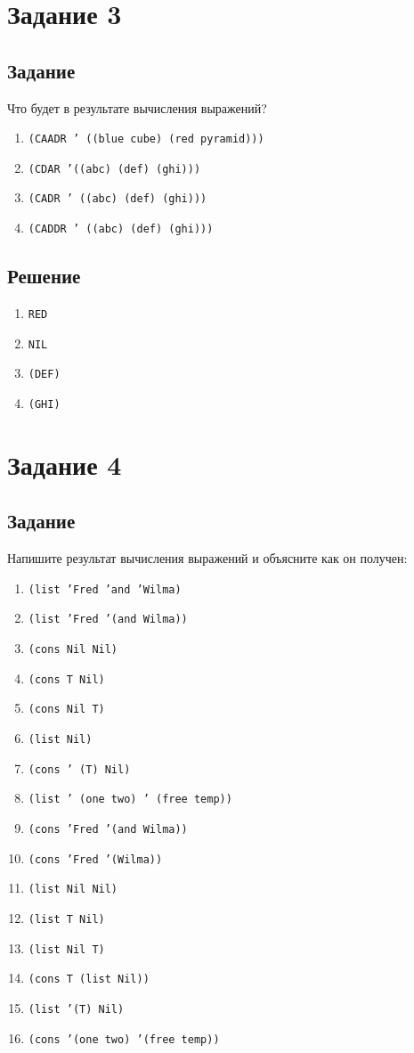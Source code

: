 \section{Задание 3}
\subsection{Задание}
Что будет в результате вычисления выражений?
\begin{enumerate}
	\item \texttt{(CAADR ' ((blue cube) (red pyramid)))}
	\item \texttt{(CDAR '((abc) (def) (ghi)))}
	\item \texttt{(CADR ' ((abc) (def) (ghi)))}
	\item \texttt{(CADDR ' ((abc) (def) (ghi)))}
\end{enumerate}

\subsection{Решение}
\begin{enumerate}
	\item \texttt{RED}
	\item \texttt{NIL}
	\item \texttt{(DEF)}
	\item \texttt{(GHI)}
\end{enumerate}

\section{Задание 4}
\subsection{Задание}
Напишите результат вычисления выражений и объясните как он получен:
\begin{enumerate}
	\item \texttt{(list 'Fred 'and 'Wilma)}
	\item \texttt{(list 'Fred '(and Wilma))}
	\item \texttt{(cons Nil Nil)}
	\item \texttt{(cons T Nil)}
	\item \texttt{(cons Nil T)}
	\item \texttt{(list Nil)}
	\item \texttt{(cons ' (T) Nil)}
	\item \texttt{(list ' (one two) ' (free temp))}
	\item \texttt{(cons 'Fred '(and Wilma))}
	\item \texttt{(cons 'Fred '(Wilma))}
	\item \texttt{(list Nil Nil)}
	\item \texttt{(list T Nil)}
	\item \texttt{(list Nil T)}
	\item \texttt{(cons T (list Nil))}
	\item \texttt{(list '(T) Nil)}
	\item \texttt{(cons '(one two) '(free temp))}
\end{enumerate}
